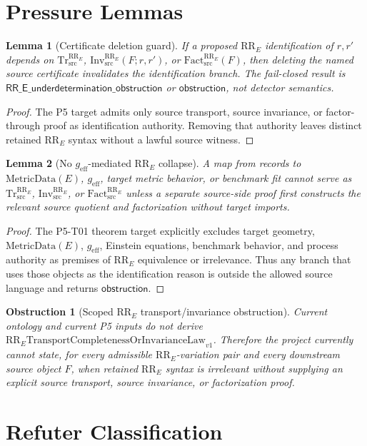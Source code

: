 \documentclass[11pt]{article}
\newcommand{\RRE}{\mathrm{RR}_{E}}
\newcommand{\TrRR}{\mathrm{Tr}^{\RRE}_{\mathrm{src}}}
\newcommand{\InvRR}{\mathrm{Inv}^{\RRE}_{\mathrm{src}}}
\newcommand{\FactRR}{\mathrm{Fact}^{\RRE}_{\mathrm{src}}}
\newcommand{\MetricData}{\mathrm{MetricData}}
\newcommand{\geff}{g_{\mathrm{eff}}}
\newcommand{\Obstruction}{\mathsf{obstruction}}
\newcommand{\RRUnder}{\mathsf{RR\_E\_underdetermination\_obstruction}}
\newcommand{\MissingLaw}{\mathrm{RR}_{E}\mathrm{TransportCompletenessOrInvarianceLaw}_{v1}}
\newtheorem{lemma}{Lemma}
\newtheorem{obstruction}{Obstruction}
\begin{document}
\section{Pressure Lemmas}

\begin{lemma}[Certificate deletion guard]
If a proposed \(\RRE\) identification of \(r,r'\) depends on \(\TrRR\),
\(\InvRR(F;r,r')\), or \(\FactRR(F)\), then deleting the named source
certificate invalidates the identification branch. The fail-closed result is
\(\RRUnder\) or \(\Obstruction\), not detector semantics.
\end{lemma}

\begin{proof}
The P5 target admits only source transport, source invariance, or
factor-through proof as identification authority. Removing that authority
leaves distinct retained \(\RRE\) syntax without a lawful source witness.
\end{proof}

\begin{lemma}[No \(\geff\)-mediated \(\RRE\) collapse]
A map from records to \(\MetricData(E)\), \(\geff\), target metric behavior, or
benchmark fit cannot serve as \(\TrRR\), \(\InvRR\), or \(\FactRR\) unless a
separate source-side proof first constructs the relevant source quotient and
factorization without target imports.
\end{lemma}

\begin{proof}
The P5-T01 theorem target explicitly excludes target geometry, \(\MetricData(E)\),
\(\geff\), Einstein equations, benchmark behavior, and process authority as
premises of \(\RRE\) equivalence or irrelevance. Thus any branch that uses
those objects as the identification reason is outside the allowed source
language and returns \(\Obstruction\).
\end{proof}

\begin{obstruction}[Scoped \(\RRE\) transport/invariance obstruction]
Current ontology and current P5 inputs do not derive \(\MissingLaw\). Therefore
the project currently cannot state, for every admissible \(\RRE\)-variation
pair and every downstream source object \(F\), when retained \(\RRE\) syntax is
irrelevant without supplying an explicit source transport, source invariance,
or factorization proof.
\end{obstruction}

\section{Refuter Classification}
\end{document}
